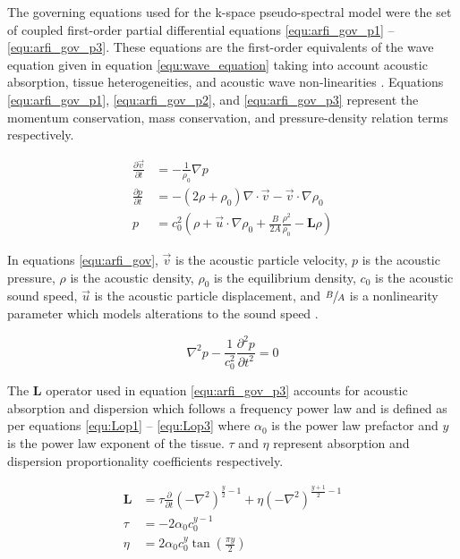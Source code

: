 			The governing equations used for the k-space pseudo-spectral model were the set of coupled first-order partial differential equations \ref{equ:arfi_gov_p1} -- \ref{equ:arfi_gov_p3}. These equations are the first-order equivalents of the wave equation given in equation \ref{equ:wave_equation} taking into account acoustic absorption, tissue heterogeneities, and acoustic wave non-linearities \cite{treeby12}. Equations \ref{equ:arfi_gov_p1}, \ref{equ:arfi_gov_p2}, and \ref{equ:arfi_gov_p3} represent the momentum conservation, mass conservation, and pressure-density relation terms respectively.

			\begin{subequations}
				\label{equ:arfi_gov}
				\begin{align}
					\frac{\partial \vec{v}}{\partial t} &= - \frac{1}{\rho_0} \nabla p \label{equ:arfi_gov_p1} \\
					\frac{\partial p}{\partial t} &= -\left(2 \rho + \rho_0\right)\nabla \cdot \vec{v} - \vec{v} \cdot \nabla \rho_0 \label{equ:arfi_gov_p2} \\
					p &= c_0^2 \left(\rho + \vec{u} \cdot \nabla \rho_0 + \frac{B}{2A} \frac{\rho^2}{\rho_0} - \mathbf{L}\rho \right) \label{equ:arfi_gov_p3}
				\end{align}
			\end{subequations}

			In equations \ref{equ:arfi_gov}, $\vec{v}$ is the acoustic particle velocity, $p$ is the acoustic pressure, $\rho$ is the acoustic density, $\rho_0$ is the equilibrium density, $c_0$ is the acoustic sound speed, $\vec{u}$ is the acoustic particle displacement, and $\sfrac{B}{A}$ is a nonlinearity parameter which models alterations to the sound speed \cite{beyer08}.

			\begin{equation}
				\label{equ:wave_equation}
				\nabla^2 p - \frac{1}{c_0^2}\frac{\partial^2 p}{\partial t^2} = 0
			\end{equation}

			The $\mathbf{L}$ operator used in equation \ref{equ:arfi_gov_p3} accounts for acoustic absorption and dispersion which follows a frequency power law and is defined as per equations \ref{equ:Lop1} -- \ref{equ:Lop3} where $\alpha_0$ is the power law prefactor and $y$ is the power law exponent of the tissue. $\tau$ and $\eta$ represent absorption and dispersion proportionality coefficients respectively.

			\begin{subequations}
				\begin{align}
					\mathbf{L} &= \tau \frac{\partial}{\partial t}\left(-\nabla^2\right)^{\frac{y}{2} - 1} + \eta \left(-\nabla^2\right)^{\frac{y+1}{2} - 1} \label{equ:Lop1} \\
					\tau &= -2\alpha_0 c_0^{y-1} \label{equ:Lop2} \\
					\eta &= 2\alpha_0c_0^y\tan\left(\frac{\pi y}{2}\right)  \label{equ:Lop3}
				\end{align}
			\end{subequations}

